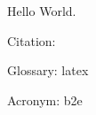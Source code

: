 \noindent Hello World.

\noindent Citation: \cite{foo}

\noindent Glossary: \gls{latex}

\noindent Acronym: \acrlong{b2e}

\clearpage
